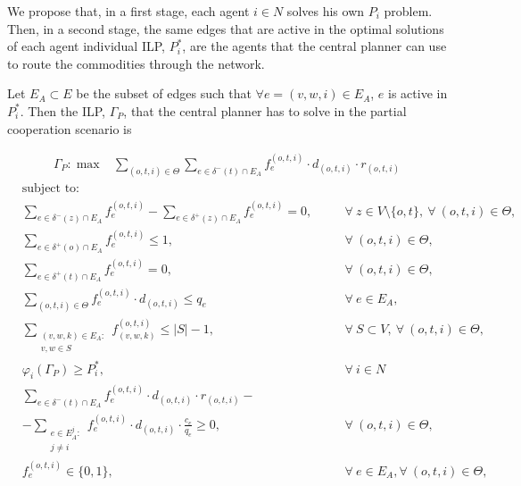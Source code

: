\documentclass[review]{elsarticle}
\begin{document}
We propose that, in a first stage, each agent $i \in N$ solves his own $P_i$ problem. Then, in a second stage, the same edges that are active in the optimal solutions of each agent individual ILP, $P_i^*$, are the agents that the central planner can use to route the commodities through the network.

Let $E_A \subset E$ be the subset of edges such that $\forall e=(v,w,i) \in
E_A$, $e$ is active in $P_i^*$. Then the ILP, $\Gamma_P$, that the central planner has to solve in the partial cooperation scenario is

\begin{align}
        &  \Gamma_P: \max  & \sum_{(o,t,i) \in \Theta} \sum_{e \in \delta^-(t)\cap E_A}  f_e^{(o,t,i)} \cdot d_{(o,t,i)} \cdot r_{(o,t,i)}  &&   \label{eq:Partial2CooperationA} 
    \end{align}
    \begin{align}
        & \text{subject to:}       && \nonumber\\
        & \sum_{e \in \delta^-(z)\cap E_A} f_e^{(o,t,i)}-\sum_{e \in \delta^+(z)\cap E_A} f_{e}^{(o,t,i)} = 0,            \quad && \forall\ z\in V\setminus\{o,t\},\ \forall\ (o,t,i)\in\Theta,  \label{eq:Partial2CooperationB}\\[1em]
& \sum_{e \in \delta^+(o)\cap E_A} f_e^{(o,t,i)} \leq 1,  && \forall\ (o,t,i)\in \Theta, \label{eq:Partial2CooperationC} \\
& \sum_{e \in \delta^+(t)\cap E_A} f_e^{(o,t,i)} = 0,  && \forall\ (o,t,i)\in \Theta, \label{eq:Partial2CooperationD} \\
 & \sum_{(o,t,i) \in \Theta} f_e^{(o,t,i)}\cdot d_{(o,t,i)} \leq q_e     && \forall\ e \in E_A, \label{eq:Partial2CooperationE}  \\
 & \sum_{\substack{(v,w,k) \in E_A\colon \\ v,w \in S}} f_{(v,w,k)}^{(o,t,i)}  \leq |S| -1,    && \forall\ S \subset V,\ \forall\ (o,t,i) \in \Theta, \label{eq:Partial2CooperationF}\\
& \varphi_i(\Gamma_P)   \geq P_i^*,     && \forall\ i\in N \label{eq:Partial2CooperationG}\\
&\sum_{e \in \delta^-(t)\cap E_A}  f_e^{(o,t,i)} \cdot d_{(o,t,i)} \cdot r_{(o,t,i)} - && \nonumber\\
& -\sum_{\substack{e \in E_A^j\colon \\ j\not = i}} f_e^{(o,t,i)} \cdot d_{(o,t,i)} \cdot \frac{c_e}{q_e}\geq 0, && \forall\ (o,t,i) \in \Theta, \label{eq:Partial2CooperationH} \\
 & f_e^{(o,t,i)}  \in \{0,1\},    && \forall\ e \in E_A, \forall\ (o,t,i) \in \Theta, \label{eq:Partial2CooperationI} \\
    \end{align}
   
\end{document}
